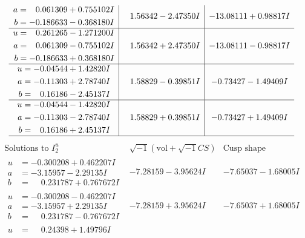 \documentclass[1p]{elsarticle_modified}
\theoremstyle{definition}
\newcommand{\I}{\sqrt{-1}}
\begin{document}
$$\begin{array}{c|c|c}
\begin{aligned}
a &= \phantom{-}0.061309 + 0.755102 I \\
b &= -0.186633 - 0.368180 I\end{aligned}
 & \phantom{-}1.56342 - 2.47350 I & -13.08111 + 0.98817 I \\ \hline\begin{aligned}
u &= \phantom{-}0.261265 - 1.271200 I \\
a &= \phantom{-}0.061309 - 0.755102 I \\
b &= -0.186633 + 0.368180 I\end{aligned}
 & \phantom{-}1.56342 + 2.47350 I & -13.08111 - 0.98817 I \\ \hline\begin{aligned}
u &= -0.04544 + 1.42820 I \\
a &= -0.11303 + 2.78740 I \\
b &= \phantom{-}0.16186 - 2.45137 I\end{aligned}
 & \phantom{-}1.58829 - 0.39851 I & -0.73427 - 1.49409 I \\ \hline\begin{aligned}
u &= -0.04544 - 1.42820 I \\
a &= -0.11303 - 2.78740 I \\
b &= \phantom{-}0.16186 + 2.45137 I\end{aligned}
 & \phantom{-}1.58829 + 0.39851 I & -0.73427 + 1.49409 I\\
 \hline 
 \end{array}$$\newpage$$\begin{array}{c|c|c}  
\text{Solutions to }I^u_{2}& \I (\text{vol} + \sqrt{-1}CS) & \text{Cusp shape}\\
 \hline 
\begin{aligned}
u &= -0.300208 + 0.462207 I \\
a &= -3.15957 - 2.29135 I \\
b &= \phantom{-}0.231787 + 0.767672 I\end{aligned}
 & -7.28159 - 3.95624 I & -7.65037 - 1.68005 I \\ \hline\begin{aligned}
u &= -0.300208 - 0.462207 I \\
a &= -3.15957 + 2.29135 I \\
b &= \phantom{-}0.231787 - 0.767672 I\end{aligned}
 & -7.28159 + 3.95624 I & -7.65037 + 1.68005 I \\ \hline\begin{aligned}
u &= \phantom{-}0.24398 + 1.49796 I \\

\end{aligned}
\end{array}$$
\end{document}
